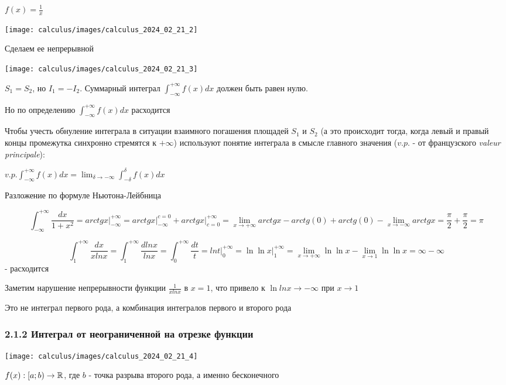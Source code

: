\documentclass[12pt]{article}
\begin{document}
    \Ex $f(x) = \frac{1}{x}$

    \texttt{[image: calculus/images/calculus\_2024\_02\_21\_2]}

    Сделаем ее непрерывной

    \texttt{[image: calculus/images/calculus\_2024\_02\_21\_3]}

    $S_1 = S_2$, но $I_1 = -I_2$. Суммарный интеграл $\displaystyle \int^{+\infty}_{-\infty} f(x) dx$ должен быть равен нулю.

    Но по определению $\displaystyle \int^{+\infty}_{-\infty} f(x) dx$ расходится

    Чтобы учесть обнуление интеграла в ситуации взаимного погашения площадей $S_1$ и $S_2$
    (а это происходит тогда, когда левый и правый концы промежутка синхронно стремятся к $+\infty$)
    используют понятие интеграла в смысле главного значения ($v.p.$ - от французского \textit{valeur principale}):

    $\displaystyle v.p. \int^{+\infty}_{-\infty} f(x) dx = \lim_{\delta \to -\infty} \int^{\delta}_{-\delta} f(x) dx$

    Разложение по формуле Ньютона-Лейбница

     \[\int^{+\infty}_{-\infty} \frac{dx}{1 + x^2} = arctg x \Big|^{+\infty}_{-\infty} = arctg x \Big|^{c = 0}_{-\infty} + arctg x \Big|^{+\infty}_{c = 0} =
    \lim_{x \to +\infty} arctgx - arctg(0) + arctg(0) - \lim_{x \to -\infty} arctgx = \frac{\pi}{2} + \frac{\pi}{2} = \pi\]

     \[\int^{+\infty}_{1} \frac{dx}{xlnx} = \int^{+\infty}_{1} \frac{dlnx}{lnx} = \int^{+\infty}_{0} \frac{dt}{t}
     = lnt \Big|^{+\infty}_{0} = \ln \ln x \Big|^{+\infty}_{1} = \lim_{x \to +\infty} \ln \ln x - \lim_{x \to 1} \ln \ln x = \infty - \infty\] - расходится

    Заметим нарушение непрерывности функции $\frac{1}{xlnx}$ в $x = 1$, что привело к $\ln lnx \to -\infty$ при $x \to 1$

    Это не интеграл первого рода, а комбинация интегралов первого и второго рода

    \subsubsection{2.1.2 Интеграл от неограниченной на отрезке функции}

    \texttt{[image: calculus/images/calculus\_2024\_02\_21\_4]}

    $f(x) : [a; b) \to \mathbb{R}$, где $b$ - точка разрыва второго рода, а именно бесконечного
\end{document}
